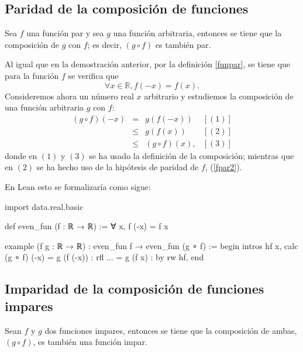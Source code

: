 \subsection{Paridad de la composición de funciones}

\begin{teorema}
  Sea \(f\) una función par y sea \(g\) una función arbitraria, entonces
  se tiene que la composición de \(g\) con \(f\); es decir, \((g ∘ f)\)
  es también par.
\end{teorema}

\begin{demostracion}
  Al igual que en la demostración anterior, por la definición
  \ref{funpar}, se tiene que para la función \(f\) se verifica que
  \begin{equation}\label{fpar2}
     ∀ x ∈ ℝ, f(-x) = f(x).
  \end{equation}
  Consideremos ahora un número real \(x\) arbitrario y estudiemos la
  composición de una función arbitraria \(g\) con \(f\):
  \[\begin{array}{llll}
      (g ∘ f)(-x) &= &g(f(-x))    & [(1)]\\
                  &≤ &g(f(x))     & [(2)] \\
                  &≤ &(g ∘ f)(x), & [(3)]
    \end{array}\]
  donde en \((1)\) y \((3)\) se ha usado la definición de la
  composición; mientras que en \((2)\) se ha hecho uso de la hipótesis
  de paridad de \(f\), (\ref{fpar2}).
\end{demostracion}

En Lean esto se formalizaría como sigue:
\begin{leancode}
import data.real.basic

def even_fun (f : ℝ → ℝ) := ∀ x, f (-x) = f x

example (f g : ℝ → ℝ) : even_fun f → even_fun (g ∘ f) :=
begin
  intros hf x,
  calc (g ∘ f) (-x)
      = g (f (-x)) : rfl
  ... = g (f x)    : by rw hf,
end
\end{leancode}


\subsection{Imparidad de la composición de funciones impares}

\begin{teorema}
  Sean \(f\) y \(g\) dos funciones impares, entonces se tiene que la
  composición de ambas, \((g ∘ f)\), es también una función impar.
\end{teorema}

